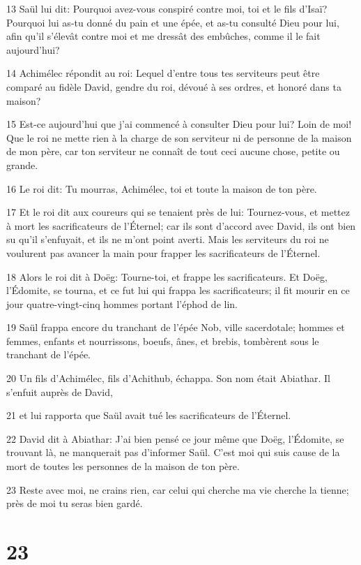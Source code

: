 \par 13 Saül lui dit: Pourquoi avez-vous conspiré contre moi, toi et le fils d'Isaï? Pourquoi lui as-tu donné du pain et une épée, et as-tu consulté Dieu pour lui, afin qu'il s'élevât contre moi et me dressât des embûches, comme il le fait aujourd'hui?
\par 14 Achimélec répondit au roi: Lequel d'entre tous tes serviteurs peut être comparé au fidèle David, gendre du roi, dévoué à ses ordres, et honoré dans ta maison?
\par 15 Est-ce aujourd'hui que j'ai commencé à consulter Dieu pour lui? Loin de moi! Que le roi ne mette rien à la charge de son serviteur ni de personne de la maison de mon père, car ton serviteur ne connaît de tout ceci aucune chose, petite ou grande.
\par 16 Le roi dit: Tu mourras, Achimélec, toi et toute la maison de ton père.
\par 17 Et le roi dit aux coureurs qui se tenaient près de lui: Tournez-vous, et mettez à mort les sacrificateurs de l'Éternel; car ils sont d'accord avec David, ils ont bien su qu'il s'enfuyait, et ils ne m'ont point averti. Mais les serviteurs du roi ne voulurent pas avancer la main pour frapper les sacrificateurs de l'Éternel.
\par 18 Alors le roi dit à Doëg: Tourne-toi, et frappe les sacrificateurs. Et Doëg, l'Édomite, se tourna, et ce fut lui qui frappa les sacrificateurs; il fit mourir en ce jour quatre-vingt-cinq hommes portant l'éphod de lin.
\par 19 Saül frappa encore du tranchant de l'épée Nob, ville sacerdotale; hommes et femmes, enfants et nourrissons, boeufs, ânes, et brebis, tombèrent sous le tranchant de l'épée.
\par 20 Un fils d'Achimélec, fils d'Achithub, échappa. Son nom était Abiathar. Il s'enfuit auprès de David,
\par 21 et lui rapporta que Saül avait tué les sacrificateurs de l'Éternel.
\par 22 David dit à Abiathar: J'ai bien pensé ce jour même que Doëg, l'Édomite, se trouvant là, ne manquerait pas d'informer Saül. C'est moi qui suis cause de la mort de toutes les personnes de la maison de ton père.
\par 23 Reste avec moi, ne crains rien, car celui qui cherche ma vie cherche la tienne; près de moi tu seras bien gardé.

\chapter{23}

